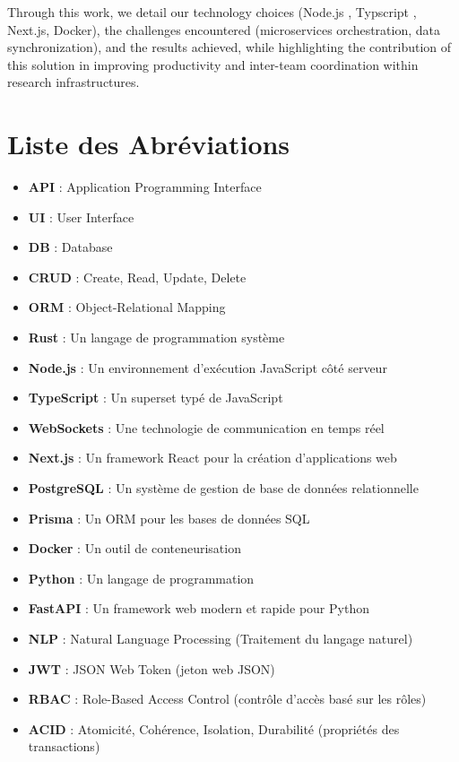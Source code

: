 \documentclass{rapportPfe}
\begin{document}
Through this work, we detail our technology choices (Node.js , Typscript , Next.js, Docker), the challenges encountered (microservices orchestration, data synchronization), and the results achieved, while highlighting the contribution of this solution in improving productivity and inter-team coordination within research infrastructures.

\chapter*{Liste des Abréviations}
	\begin{itemize}
	  \item \textbf{API} : Application Programming Interface
	  \item \textbf{UI} : User Interface
	  \item \textbf{DB} : Database
	  \item \textbf{CRUD} : Create, Read, Update, Delete
	  \item \textbf{ORM} : Object-Relational Mapping
	  \item \textbf{Rust} : Un langage de programmation système
	  \item \textbf{Node.js} : Un environnement d'exécution JavaScript côté serveur
	  \item \textbf{TypeScript} : Un superset typé de JavaScript
	  \item \textbf{WebSockets} : Une technologie de communication en temps réel
	  \item \textbf{Next.js} : Un framework React pour la création d'applications web
	  \item \textbf{PostgreSQL} : Un système de gestion de base de données relationnelle
	  \item \textbf{Prisma} : Un ORM pour les bases de données SQL
	  \item \textbf{Docker} : Un outil de conteneurisation
	  \item \textbf{Python} : Un langage de programmation
	  \item \textbf{FastAPI} : Un framework web modern et rapide pour Python
	  \item \textbf{NLP} : Natural Language Processing (Traitement du langage naturel)
	  \item \textbf{JWT} : JSON Web Token (jeton web JSON)
	  \item \textbf{RBAC} : Role-Based Access Control (contrôle d'accès basé sur les rôles)
	  \item \textbf{ACID} : Atomicité, Cohérence, Isolation, Durabilité (propriétés des transactions)

\end{itemize}
\end{document}
